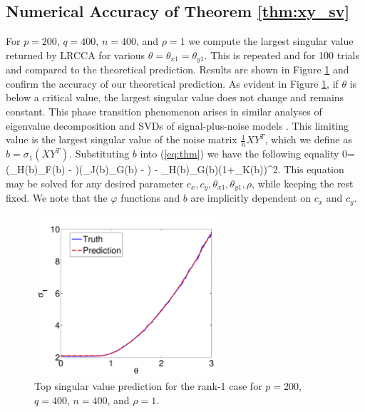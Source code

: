 \subsection{Numerical Accuracy of Theorem \ref{thm:xy_sv}}

For $p=200$, $q=400$, $n=400$, and $\rho=1$ we compute the largest singular value returned
by LRCCA for various $\theta=\theta_{x1}=\theta_{y1}$. This is repeated and for 100 trials
and compared to the theoretical prediction. Results are shown in Figure \ref{fig:chpt6:sv_pred}
and confirm the accuracy of our theoretical prediction. As evident in Figure
\ref{fig:chpt6:sv_pred}, if $\theta$ is below a critical value, the largest singular value does
not change and remains constant. This phase transition phenomenon arises in similar
analyses of eigenvalue decomposition and SVDs of signal-plus-noise models \cite{benaych2011eigenvalues,benaych2012singular,paul2007asymptotics}. This limiting value is the largest singular value of the noise matrix
$\frac{1}{n}XY^T$, which we define as $b=\sigma_1\left(XY^T\right)$. Substituting $b$ into
(\ref{eq:thm}) we have the following equality
\beq\label{eq:pt}
 0=\left(\varphi_H(b)\varphi_F(b) -
\right)\left(\varphi_J(b)\varphi_G(b) -
\right) -
\rho\varphi_H(b)\varphi_G(b)\left(1+\varphi_K(b)\right)^2.
\eeq
This equation may be solved for any desired parameter $c_x, c_y, \theta_{x1}, \theta_{y1},
\rho$, while keeping the rest fixed. We note that the $\varphi$ functions and $b$ are implicitly dependent on $c_x$ and $c_y$.

\begin{figure}
  \begin{center}
    \includegraphics[width=0.6\textwidth]{chpt6_xy/figures/sigma_pred.pdf}
    \caption{Top singular value prediction for the rank-1 case for $p=200$, $q=400$,
      $n=400$, and $\rho=1$.}
    \label{fig:chpt6:sv_pred}
  \end{center}
\end{figure}

